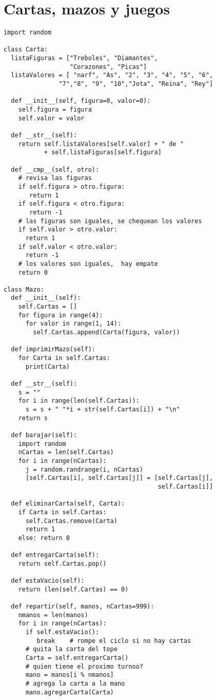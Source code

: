 \section{Cartas, mazos y juegos}

\begin{verbatim}
import random

class Carta:
  listaFiguras = ["Treboles", "Diamantes", 
                  "Corazones", "Picas"]
  listaValores = [ "narf", "As", "2", "3", "4", "5", "6", 
               "7","8", "9", "10","Jota", "Reina", "Rey"]

  def __init__(self, figura=0, valor=0):
    self.figura = figura
    self.valor = valor

  def __str__(self):
    return self.listaValores[self.valor] + " de " 
           + self.listaFiguras[self.figura]

  def __cmp__(self, otro):
    # revisa las figuras
    if self.figura > otro.figura: 
       return 1
    if self.figura < otro.figura: 
       return -1
    # las figuras son iguales, se chequean los valores
    if self.valor > otro.valor: 
      return 1
    if self.valor < otro.valor: 
      return -1
    # los valores son iguales,  hay empate
    return 0

class Mazo:
  def __init__(self):
    self.Cartas = []
    for figura in range(4):
      for valor in range(1, 14):
        self.Cartas.append(Carta(figura, valor))

  def imprimirMazo(self):
    for Carta in self.Cartas:
      print(Carta)

  def __str__(self):
    s = ""
    for i in range(len(self.Cartas)):
      s = s + " "*i + str(self.Cartas[i]) + "\n"
    return s

  def barajar(self):
    import random
    nCartas = len(self.Cartas)
    for i in range(nCartas):
      j = random.randrange(i, nCartas)
      [self.Cartas[i], self.Cartas[j]] = [self.Cartas[j], 
                                          self.Cartas[i]]

  def eliminarCarta(self, Carta):
    if Carta in self.Cartas:
      self.Cartas.remove(Carta)
      return 1
    else: return 0

  def entregarCarta(self):
    return self.Cartas.pop()

  def estaVacio(self):
    return (len(self.Cartas) == 0)

  def repartir(self, manos, nCartas=999):
    nmanos = len(manos)
    for i in range(nCartas):
      if self.estaVacio(): 
         break    # rompe el ciclo si no hay cartas
      # quita la carta del tope
      Carta = self.entregarCarta()      
      # quien tiene el proximo turnoo?
      mano = manos[i % nmanos]    
      # agrega la carta a la mano
      mano.agregarCarta(Carta)         


\end{verbatim}
